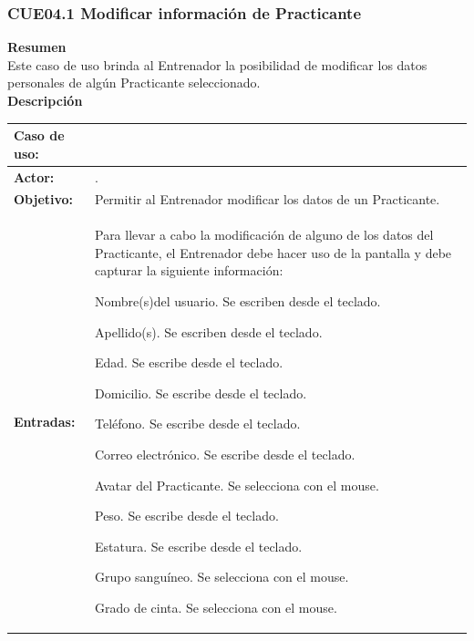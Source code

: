 \subsubsection{CUE04.1 Modificar información de Practicante}
\label{cu:CUE04.1}

\textbf{\textcolor[rgb]{0, 0, 0.545098}{Resumen}} \\

Este caso de uso brinda al Entrenador la posibilidad de modificar los datos personales de algún Practicante seleccionado.\\

\textbf{\textcolor[rgb]{0, 0, 0.545098}{Descripción}}

\begin{table}[H]
\centering
\begin{tabular}{| l | p{12 cm} |}
\hline
\rowcolor[rgb]{0.529412, 0.807843, 0.980392} {\textbf{Caso de uso:}} & \hspace{4em}{\textbf{CUE04.1 Modificar información de Practicante}}\\
\hline
\textbf{Actor:} &  \nameref{act:Entrenador}. \\
\hline
\textbf{Objetivo:} & Permitir al Entrenador modificar los datos de un Practicante.\\
\hline
\textbf{Entradas:} & Para llevar a cabo la modificación de alguno de los datos del Practicante, el Entrenador debe hacer uso de la pantalla \nameref{pant:IUE04.1} y debe capturar la siguiente información:
		\begin{compactitem} 
			\setlength\itemsep{-0.25em}
			\item Nombre(s)del usuario. Se escriben desde el teclado.
			\item Apellido(s). Se escriben desde el teclado.
			\item Edad. Se escribe desde el teclado.
			\item Domicilio. Se escribe desde el teclado.
			\item Teléfono. Se escribe desde el teclado.
			\item Correo electrónico. Se escribe desde el teclado.
			\item Avatar del Practicante. Se selecciona con el mouse.
			\item Peso. Se escribe desde el teclado.
			\item Estatura. Se escribe desde el teclado.
			\item Grupo sanguíneo. Se selecciona con el mouse.
			\item Grado de cinta. Se selecciona con el mouse.

\end{compactitem}
\end{tabular}
\end{table}
